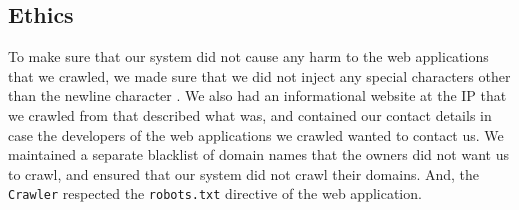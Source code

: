 \subsection{Ethics}

To make sure that our system did not cause any harm to the web applications that we crawled, we made sure that we did not inject any special characters other than the newline character%
. We also had an informational website at the IP that we crawled from that described what \ehi was, and contained our contact details in case the developers of the web applications we crawled wanted to contact us. We maintained a separate blacklist of domain names that the owners did not want us to crawl, and ensured that our system did not crawl their domains. And, the \lstinline{Crawler} respected the \lstinline{robots.txt} directive of the web application. 
